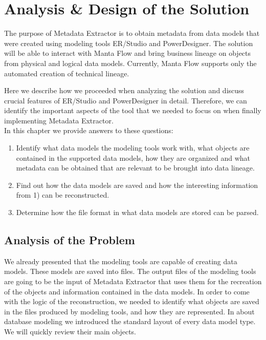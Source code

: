 \chapter{Analysis \& Design of the Solution}
\label{analysis_design}

The purpose of Metadata Extractor is to obtain metadata from data models that were created using modeling tools ER/Studio and PowerDesigner. 
The solution will be able to interact with Manta Flow and bring business lineage on objects from physical and logical data models. 
Currently, Manta Flow supports only the automated creation of technical lineage.

Here we describe how we proceeded when analyzing the solution and discuss crucial features of ER/Studio and PowerDesigner in detail.
Therefore, we can identify the important aspects of the tool that we needed to focus on when finally implementing Metadata Extractor.\\

In this chapter we provide answers to these questions:
\begin{enumerate}
	\item Identify what data models the modeling tools work with, what objects are contained in the supported data models, how they are organized and what metadata can be obtained that are relevant to be brought into data lineage.
	\item Find out how the data models are saved and how the interesting information from 1) can be reconstructed.
	\item Determine how the file format in what data models are stored can be parsed.
\end{enumerate}

\section{Analysis of the Problem}

We already presented that the modeling tools are capable of creating data models. These models are saved into files. 
The output files of the modeling tools are going to be the input of Metadata Extractor that uses them for the recreation of the objects and information contained in the data models.
In order to come with the logic of the reconstruction, we needed to identify what objects are saved in the files produced by modeling tools, and how they are represented. 
In  about database modeling we introduced the standard layout of every data model type. We will quickly review their main objects. \\

